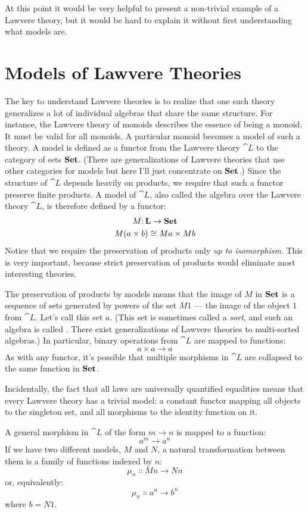 At this point it would be very helpful to present a non-trivial example
of a Lawvere theory, but it would be hard to explain it without first
understanding what models are.

\section{Models of Lawvere Theories}

The key to understand Lawvere theories is to realize that one such
theory generalizes a lot of individual algebras that share the same
structure. For instance, the Lawvere theory of monoids describes the
essence of being a monoid. It must be valid for all monoids. A
particular monoid becomes a model of such a theory. A model is defined
as a functor from the Lawvere theory $\cat{L}$ to the category of sets
$\mathbf{Set}$. (There are generalizations of Lawvere theories that use
other categories for models but here I'll just concentrate on
$\mathbf{Set}$.) Since the structure of $\cat{L}$ depends heavily on
products, we require that such a functor preserve finite products. A
model of $\cat{L}$, also called the algebra over the Lawvere theory
$\cat{L}$, is therefore defined by a functor:
\begin{gather*}
	M \mathpunct{:} \mathbf{L} \to \mathbf{Set} \\
	M (a \times b) \cong M a \times M b
\end{gather*}
Notice that we require the preservation of products only \emph{up to
	isomorphism}. This is very important, because strict preservation of
products would eliminate most interesting theories.

The preservation of products by models means that the image of
$M$ in $\mathbf{Set}$ is a sequence of sets generated by powers of
the set $M 1$ --- the image of the object $1$ from
$\cat{L}$. Let's call this set $a$. (This set is sometimes
called a \emph{sort}, and such an algebra is called . There
exist generalizations of Lawvere theories to multi-sorted algebras.) In
particular, binary operations from $\cat{L}$ are mapped to functions:
\[a \times a \to a\]
As with any functor, it's possible that multiple morphisms in $\cat{L}$
are collapsed to the same function in $\mathbf{Set}$.

Incidentally, the fact that all laws are universally quantified
equalities means that every Lawvere theory has a trivial model: a
constant functor mapping all objects to the singleton set, and all morphisms
to the identity function on it.

A general morphism in $\cat{L}$ of the form
$m \to n$ is mapped to a function:
\[a^m \to a^n\]
If we have two different models, $M$ and $N$, a natural
transformation between them is a family of functions indexed by
$n$:
\[\mu_n \Colon M n \to N n\]
or, equivalently:
\[\mu_n \Colon a^n \to b^n\]
where $b = N 1$.

